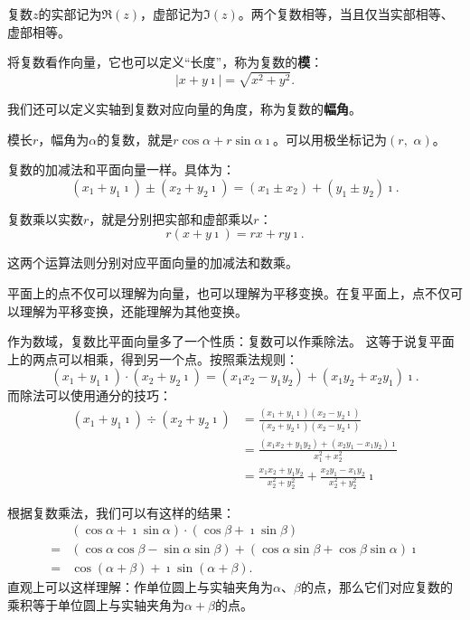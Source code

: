 \documentclass[12pt,UTF8,fontset=none]{ctexbook}
\begin{document}
复数$z$的实部记为$\Re(z)$，虚部记为$\Im(z)$。两个复数相等，当且仅当实部相等、虚部相等。

将复数看作向量，它也可以定义“长度”，称为复数的\textbf{模}：
$$ |x + y\imath| = \sqrt{x^2 + y^2}.$$

我们还可以定义实轴到复数对应向量的角度，称为复数的\textbf{幅角}。

模长$r$，幅角为$\alpha$的复数，就是$r\cos{\alpha} + r\sin{\alpha}\imath$。可以用极坐标记为$(r,\,\,\alpha)$。

复数的加减法和平面向量一样。具体为：
$$ (x_1 + y_1\imath) \pm (x_2 + y_2\imath) = (x_1 \pm x_2) + (y_1 \pm y_2)\imath. $$

复数乘以实数$r$，就是分别把实部和虚部乘以$r$：
$$ r(x + y\imath) = rx + ry\imath. $$

这两个运算法则分别对应平面向量的加减法和数乘。

平面上的点不仅可以理解为向量，也可以理解为平移变换。在复平面上，点不仅可以理解为平移变换，还能理解为其他变换。

作为数域，复数比平面向量多了一个性质：复数可以作乘除法。
这等于说复平面上的两点可以相乘，得到另一个点。按照乘法规则：
$$ (x_1 + y_1\imath) \cdot (x_2 + y_2\imath) = (x_1x_2 - y_1y_2) + (x_1y_2 + x_2y_1)\imath. $$
而除法可以使用通分的技巧：
\begin{align*}
    (x_1 + y_1\imath) \div (x_2 + y_2\imath) &= \frac{(x_1 + y_1\imath)(x_2 - y_2\imath)}{(x_2 + y_2\imath)(x_2 - y_2\imath)} \\
    &= \frac{(x_1x_2 + y_1y_2) + (x_2y_1 - x_1y_2)\imath}{x_1^2 + x_2^2} \\
    &= \frac{x_1x_2 + y_1y_2}{x_2^2 + y_2^2} + \frac{x_2y_1 - x_1y_2}{x_2^2 + y_2^2}\imath
\end{align*}

根据复数乘法，我们可以有这样的结果：
\begin{align*}
     & (\cos{\alpha} + \imath\sin{\alpha}) \cdot (\cos{\beta} + \imath\sin{\beta}) \\
    =& (\cos{\alpha}\cos{\beta} - \sin{\alpha}\sin{\beta}) + (\cos{\alpha}\sin{\beta} + \cos{\beta}\sin{\alpha})\imath \\
    =& \cos{(\alpha + \beta)} + \imath\sin{(\alpha + \beta)}.
\end{align*}
直观上可以这样理解：作单位圆上与实轴夹角为$\alpha$、$\beta$的点，那么它们对应复数的乘积等于单位圆上与实轴夹角为$\alpha+\beta$的点。
\end{document}
